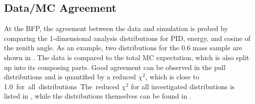 

\subsection{Data/MC Agreement}

At the BFP, the agreement between the data and simulation is probed by comparing the 1-dimensional analysis distributions for PID, energy, and cosine of the zenith angle. As an example, two distributions for the \SI{0.6}{\gev} mass sample are shown in . The data is compared to the total MC expectation, which is also split up into its composing parts. Good agreement can be observed in the pull distributions and is quantified by a reduced $\chi^2$, which is close to \SI{1.0} for all distributions. The reduced $\chi^2$ for all investigated distributions is listed in , while the distributions themselves can be found in .




